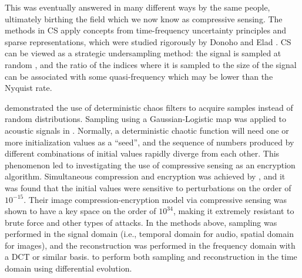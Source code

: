 \noindent This was eventually answered in many different ways by the same people, ultimately birthing the field which we now know as compressive sensing. The methods in CS apply concepts from time-frequency uncertainty principles \cite{Donoho2001} and sparse representations, which were studied rigorously by Donoho and Elad \cite{Donoho2003}. CS can be viewed as a strategic undersampling method: the signal is sampled at random , and the ratio of the indices where it is sampled to the size of the signal can be associated with some quasi-frequency which may be lower than the Nyquist rate.

 \cite{LinhTrung2008} demonstrated the use of deterministic chaos filters to acquire samples instead of random distributions. Sampling using a Gaussian-Logistic map was applied to acoustic signals in \cite{Mathew2016}. Normally, a deterministic chaotic function will need one or more initialization values as a ``seed'', and the sequence of numbers produced by different combinations of initial values rapidly diverge from each other. This phenomenon led to investigating the use of compressive sensing as an encryption algorithm. Simultaneous compression and encryption was achieved by \cite{Mo2013}, and it was found that the initial values were sensitive to perturbations on the order of $10^{-15}$. Their image compression-encryption model via compressive sensing was shown to have a key space on the order of $10^{34}$, making it extremely resistant to brute force and other types of attacks. In the methods above, sampling was performed in the signal domain (i.e., temporal domain for audio, spatial domain for images), and the reconstruction was performed in the frequency domain with a DCT or similar basis.  \cite{Andras2018}  to perform both sampling and reconstruction in the time domain using differential evolution.

